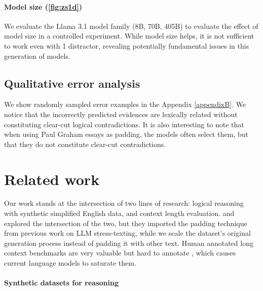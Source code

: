 \documentclass[11pt]{article}
\begin{document}

\paragraph{Model size (\ref{fig:zs1d})}
We evaluate the Llama 3.1 model family (8B, 70B, 405B) to evaluate the effect of model size in a controlled experiment. While model size helps, it is not sufficient to work even with 1 distractor, revealing potentially fundamental issues in this generation of models.

\subsection{Qualitative error analysis}
We show randomly sampled error examples in the Appendix \ref{appendixB}. We notice that the incorrectly predicted evidences are lexically related without constituting clear-cut logical contradictions. It is also interesting to note that when using Paul Graham essays as padding, the models often select them, but that they do not constitute clear-cut contradictions.

\section{Related work}

Our work stands at the intersection of two lines of research: logical reasoning with synthetic simplified English data, and context length evaluation. \citet{levy2024same} and \citet{kuratov2024babilong} explored the intersection of the two, but they imported the padding technique from previous work on LLM stress-texting, while we scale the dataset's original generation process instead of padding it with other text.
Human annotated long context benchmarks are very valuable but hard to annotate \cite{bowman2022quality,wang2024novelqa,bai2024longbench}, which causes current language models to saturate them.

\paragraph{Synthetic datasets for reasoning}

\end{document}
